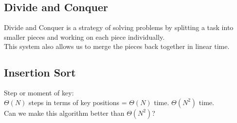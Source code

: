 \documentclass{report}
\begin{document}
\subsection{Divide and Conquer}
Divide and Conquer is a strategy of solving problems by splitting a task into smaller pieces and working on each piece individually.\\
This system also allows us to merge the pieces back together in linear time.\\
\subsection{Insertion Sort}
Step or moment of key:\\
$\Theta(N)$ steps in terms of key positions = $\Theta(N)$ time.
$\Theta(N^2)$ time.\\
Can we make this algorithm better than $\Theta(N^2)$?
\end{document}
